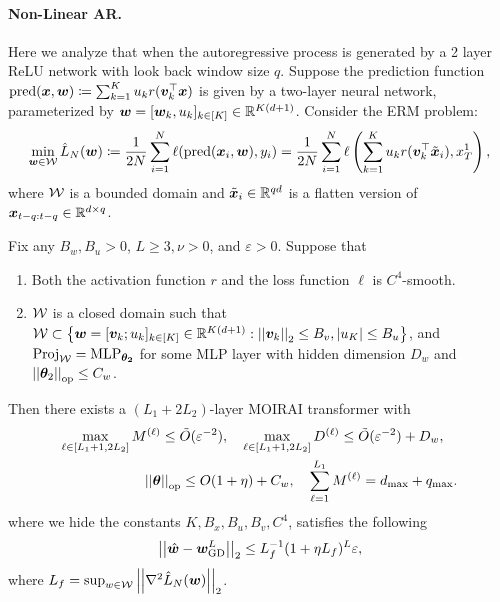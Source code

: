 \paragraph{Non-Linear AR.}
Here we analyze that when the autoregressive process is generated by a 2 layer ReLU network with look back window size $q$.
Suppose the prediction function $\text{pred}(\bm{x}, \bm{w}) \coloneqq \sum_{k=1}^K u_k r ( \bm{v}_k^\top \bm{x})$ is given by a two-layer neural network, parameterized by $\bm{w} = [\bm{w}_k, u_k]_{k\in[K]} \in \mathbb{R}^{K(d+1)}$.
Consider the ERM problem:
\[
\min_{\bm{w} \in \mathcal{W}}
\hat{L}_N(\bm{w})
\coloneq
\frac{1}{2N}
\sum_{i=1}^N
\ell( \text{pred}(\bm{x}_i, \bm{w}), y_i )
=
\frac{1}{2N}
\sum_{i=1}^N
\ell
\left(
\sum_{k=1}^K
u_k r(\bm{v}_k^\top \tilde{\bm{x}}_i), x_T^1 
\right),
\]
where $\mathcal{W}$ is a bounded domain and $\tilde{\bm{x}}_i \in \mathbb{R}^{qd}$ is a flatten version of $\bm{x}_{t-q:t-q} \in \mathbb{R}^{d\times q}$.
\begin{proposition}
    Fix any $B_w, B_u > 0$, $L \geq 3, \nu > 0$, and $\varepsilon > 0$.
    Suppose that
    \begin{enumerate}
        \item Both the activation function $r$ and the loss function $\ell$ is $C^4$-smooth.
        \item $\mathcal{W}$ is a closed domain such that $\mathcal{W} \subset \left\{ \bm{w} = [\bm{v}_k;u_k]_{k\in[K]} \in \mathbb{R}^{K(d+1)} : \left\lvert \left\lvert\bm{v}_k\right\rvert \right\rvert_2 \leq B_v, |u_K| \leq B_u \right\}$, and $\text{Proj}_{\mathcal{W}} = \text{MLP}_{\bm{\theta_2}}$ for some MLP layer with hidden dimension $D_w$ and $\left\lvert \left\lvert\bm{\theta}_2\right\rvert \right\rvert_{\text{op}} \leq C_w$.
    \end{enumerate}
    Then there exists a $(L_1 + 2 L_2)$-layer MOIRAI transformer with 
    \begin{align*}
    \max_{\ell\in[L_1+1,2L_2]}
    M^{(\ell)} \leq \tilde{O}(\varepsilon^{-2}), \quad
    \max_{\ell\in[L_1+1,2L_2]}
    D^{(\ell)} \leq \tilde{O}(\varepsilon^{-2}) + D_w, \quad
    \\
    \left\lvert \left\lvert\bm{\theta}\right\rvert \right\rvert_{\text{op}} \leq O(1+\eta) + C_w, \quad
    \sum_{\ell=1}^{L_1} M^{(\ell)} = d_{\max} + q_{\max}.
    \end{align*}
    where we hide the constants $K, B_x, B_u, B_v, C^4$,
    satisfies the following
    \[
    \left\lvert \left\lvert \hat{\bm{w}} - \bm{w}^{L}_{\text{GD}} \right\rvert \right\rvert_2
    \leq 
    L_f^{-1} ( 1 + \eta L_f)^L \varepsilon,
    \]
    where $L_f = \sup_{w\in\mathcal{W}} \left\lvert \left\lvert \nabla^2 \hat{L}_N(\bm{w}) \right\rvert \right\rvert_2$.
    
\end{proposition}

